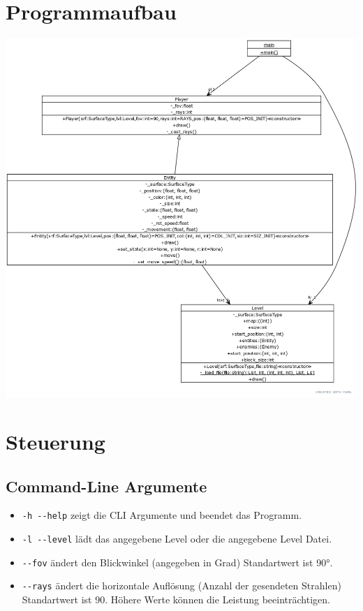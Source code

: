 \documentclass[a4paper,titlepage]{article}
\begin{document}
\newpage

\section{Programmaufbau}
\includegraphics[scale=0.35]{./img/yuml1}

\newpage

\section{Steuerung}

\subsection{Command-Line Argumente}

\begin{itemize}
	\item \verb|-h --help| zeigt die CLI Argumente und beendet das Programm.
	\item \verb|-l --level| lädt das angegebene Level oder die angegebene Level Datei.
	\item \verb|--fov| ändert den Blickwinkel (angegeben in Grad) Standartwert ist 90°.
	\item \verb|--rays| ändert die horizontale Auflösung (Anzahl der gesendeten Strahlen) Standartwert ist 90. Höhere Werte können die Leistung beeinträchtigen.
\end{itemize}
\end{document}
